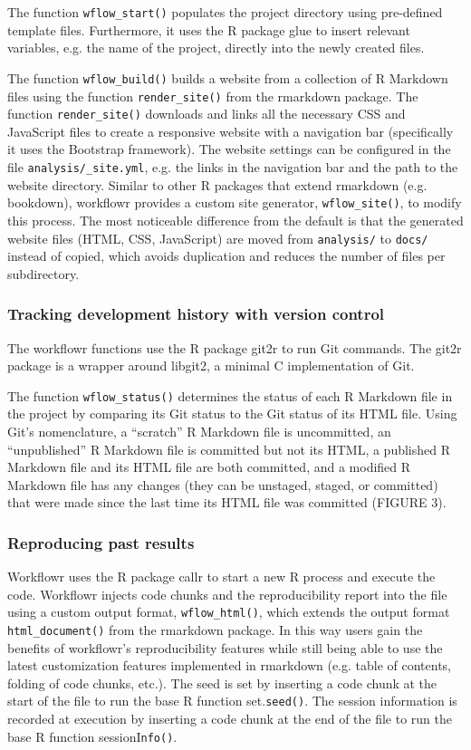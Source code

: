 \documentclass[9pt,a4paper]{extarticle}
\begin{document}
The function \verb|wflow_start()| populates the project directory using
pre-defined template files. Furthermore, it uses the R package glue to
insert relevant variables, e.g. the name of the project, directly into
the newly created files.

The function \verb|wflow_build()| builds a website from a collection of R
Markdown files using the function \verb|render_site()| from the rmarkdown
package. The function \verb|render_site()| downloads and links all the
necessary CSS and JavaScript files to create a responsive website with a
navigation bar (specifically it uses the Bootstrap framework). The
website settings can be configured in the file
\verb|analysis/_site.yml|, e.g. the links in the navigation bar and the
path to the website directory. Similar to other R packages that extend
rmarkdown (e.g. bookdown), workflowr provides a custom site generator,
\verb|wflow_site()|, to modify this process. The most noticeable difference
from the default is that the generated website files (HTML, CSS,
JavaScript) are moved from \verb|analysis/| to \verb|docs/| instead of
copied, which avoids duplication and reduces the number of files per
subdirectory.

\subsubsection*{Tracking development history with version control}

The workflowr functions use the R package git2r to run Git commands. The
git2r package is a wrapper around libgit2, a minimal C implementation of
Git.

The function \verb|wflow_status()| determines the status of each R Markdown
file in the project by comparing its Git status to the Git status of its
HTML file. Using Git’s nomenclature, a “scratch” R Markdown file is
uncommitted, an “unpublished” R Markdown file is committed but not its
HTML, a published R Markdown file and its HTML file are both committed,
and a modified R Markdown file has any changes (they can be unstaged,
staged, or committed) that were made since the last time its HTML file
was committed (FIGURE 3).

\subsubsection*{Reproducing past results}

Workflowr uses the R package callr to start a new R process and execute
the code. Workflowr injects code chunks and the reproducibility report
into the file using a custom output format, \verb|wflow_html()|, which extends
the output format \verb|html_document()| from the rmarkdown package. In this
way users gain the benefits of workflowr’s reproducibility features
while still being able to use the latest customization features
implemented in rmarkdown (e.g. table of contents, folding of code
chunks, etc.). The seed is set by inserting a code chunk at the start of
the file to run the base R function set.\verb|seed()|. The session information
is recorded at execution by inserting a code chunk at the end of the
file to run the base R function sessionI\verb|nfo()|.
\end{document}
